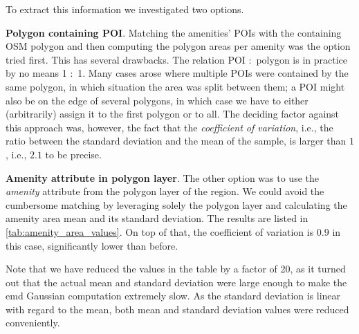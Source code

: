 \documentclass{ws-ijait}
\begin{document}
	To extract this information we investigated two options.
	\begin{romanlist}
		\item \textbf{Polygon containing POI}. 
		Matching the amenities' POIs with the containing OSM polygon and then computing the polygon areas per amenity was the option tried first. 
		This has several drawbacks. 
		The relation POI $\colon$ polygon is in practice by no means 1 $\colon$ 1.
		Many cases arose where multiple POIs were contained by the same polygon, in which situation the area was split between them; a POI might also be on the edge of several polygons, in which case we have to either (arbitrarily) assign it to the first polygon or to all. 
		The deciding factor against this approach was, however, the fact that the \textit{coefficient of variation}, i.e., the ratio between the standard deviation and the mean of the sample, is larger than $1$, i.e., $2.1$ to be precise.  
		
		\item \textbf{Amenity attribute in polygon layer}. The other option was to use the \textit{amenity} attribute from the polygon layer of the region. 
		We could avoid the cumbersome matching by leveraging solely the polygon layer and calculating the amenity area mean and its standard deviation. The results are listed in \cref{tab:amenity_area_values}. 
		On top of that, the coefficient of variation is $0.9$ in this case, significantly lower than before. 
		
		Note that we have reduced the values in the table by a factor of 20, as it turned out that the actual mean and standard deviation were large enough to make the emd Gaussian computation extremely slow. As the standard deviation is linear with regard to the mean, both mean and standard deviation values were reduced conveniently. 
		
	\end{romanlist}
	
\end{document}

